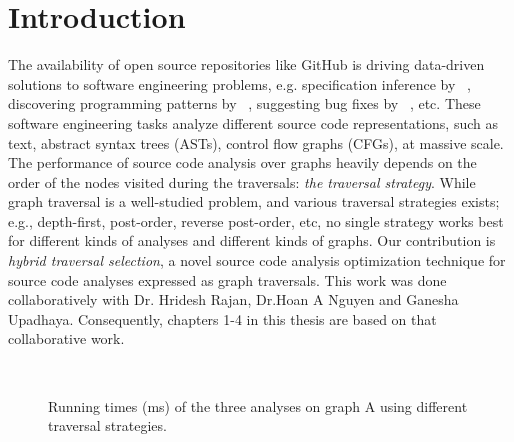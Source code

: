 \chapter{Introduction}
\label{sec:introduction}

The availability of open source repositories like GitHub is driving
data-driven solutions to software engineering problems, e.g.
specification inference by ~\cite{nguyen2014mining}, discovering programming
patterns by ~\cite{thummalapenta2009alattin}, suggesting bug
fixes by ~\cite{livshits2005dynamine,cpminer}, etc.
These software engineering tasks analyze different source code
representations, such as text, abstract syntax trees (ASTs), control
flow graphs (CFGs), at massive scale.
The performance of source code analysis over graphs heavily depends on
the order of the nodes visited during the traversals: {\em the
traversal strategy}. While graph traversal is a well-studied problem,
and various traversal strategies exists; e.g., depth-first,
post-order, reverse post-order, etc, no single strategy works best for
different kinds of analyses and different kinds of graphs.
Our contribution is {\em hybrid traversal selection}, a
novel source code analysis optimization technique for source code
analyses expressed as graph traversals. This work was done collaboratively with Dr. Hridesh Rajan, Dr.Hoan A Nguyen and Ganesha Upadhaya. Consequently, chapters 1-4 in this thesis are based on that collaborative work.

\begin{figure}[t]%
\centering
{}
\\
\caption{Running times (ms) of the three analyses on graph A using different traversal strategies.}
\label{fig:example-a-graph}
\end{figure}

